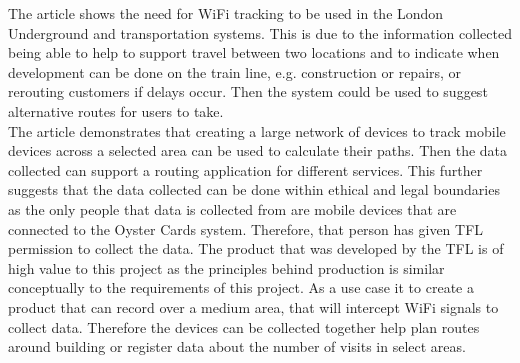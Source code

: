 \documentclass{report}
\begin{document}
The article shows the need for WiFi tracking to be used in the London Underground and transportation systems. This is due to the information collected being able to help to support travel between two locations and to indicate when development can be done on the train line, e.g. construction or repairs, or rerouting customers if delays occur. Then the system could be used to suggest alternative routes for users to take.  \\  \newline
The article demonstrates that creating a large network of devices to track mobile devices across a selected area can be used to calculate their paths. Then the data collected can support a routing application for different services. This further suggests that the data collected can be done within ethical and legal boundaries as the only people that data is collected from are mobile devices that are connected to the Oyster Cards system. Therefore, that person has given TFL permission to collect the data. The product that was developed by the TFL is of high value to this project as the principles behind production is similar conceptually to the requirements of this project. As a use case it to create a product that can record over a medium area, that will intercept WiFi signals to collect data. Therefore the devices can be collected together help plan routes around building or register data about the number of visits in select areas.  
\newpage
\end{document}
